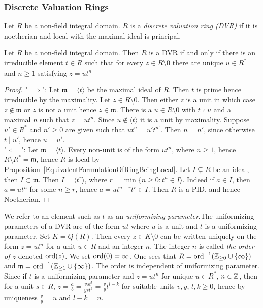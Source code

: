 \subsubsection{Discrete Valuation Rings}
    \begin{definition}
        Let $R$ be a non-field integral domain. $R$ is a \textit{discrete valuation ring (DVR)} if it is noetherian and local with the maximal ideal is principal. 
    \end{definition}
    \begin{proposition}\label{EquivalentDefinitionOfDVR}
        Let $R$ be a non-field integral domain. Then $R$ is a DVR if and only if there is an irreducible element $t\in R$ such that for every $z\in R\setminus 0$ there are unique $u\in R^\ast$ and $n\geq 1$ satisfying $z=ut^n$
    \end{proposition}
    \begin{proof}
        "$\implies $": Let $\mathfrak{m}=\langle t\rangle$ be the maximal ideal of $R$. Then $t$ is prime hence irreducible by the maximality. Let $z\in R\setminus0$. Then either $z$ is a unit in which case $z\notin \mathfrak{m}$ or $z$ is not a unit hence $z\in\mathfrak{m}$. There is a $u\in R\setminus 0$ with $t\nmid u$ and a maximal $n$ such that $z=ut^n$. Since $u\notin \langle t\rangle$ it is a unit by maximality. Suppose $u'\in R^\ast $ and $n'\geq0$ are given such that $ut^n = u't^{n'}$. Then $n=n'$, since otherwise $t\mid u'$, hence $u=u'$.\\
        "$\impliedby$": Let $\mathfrak{m}=\langle t\rangle$. Every non-unit is of the form $ut^n$, where $n\geq 1$, hence $R\setminus R^\ast = \mathfrak{m}$, hence $R$ is local by Proposition~\ref{EquivalentFormulationOfRingBeingLocal}. Let $I\subsetneq R$ be an ideal, then $I\subset \mathfrak{m}$. Then $I=\langle t^r\rangle$, where $r=\min \{n\geq 0: t^n\in I\rangle.$ Indeed if $a\in I$, then $a=ut^n$ for some $n\geq r$, hence $a=ut^{n-r}t^{r}\in I$. Then $R$ is a PID, and hence Noetherian.   
    \end{proof}
    \begin{remark}
        We refer to an element such as $t$ as an \textit{uniformizing parameter}.The uniformizing parameters of a DVR are of the form $ut$ where $u$ is a unit and $t$ is a uniformizing parameter. Set $K=Q(R)$. Then every $z\in K\setminus0$ can be written uniquely on the form $z=ut^{n}$ for a unit $u\in R$ and an integer $n$. The integer $n$ is called \textit{the order of $z$} denoted $\mathrm{ord}(z)$. We set $\mathrm{ord}(0)=\infty$. One sees that $R=\mathrm{ord}^{-1}(\mathbb{Z}_{\geq 0}\cup\{\infty\})$ and $\mathfrak{m}=\mathrm{ord}^{-1}(\mathbb{Z}_{\geq 1}\cup\{\infty\})$. The order is independent of uniformizing parameter. Since if $t$ is a uniformizing parameter and $z = ut^n$ for unique $u\in R^\ast$, $n\in \mathbb{Z}$, then for a unit $s\in R$, $z= \frac{a}{b} = \frac{vst^l}{yst^k} = \frac{v}{y}t^{l-k}$ for suitable units $v,y$, $l,k\geq 0$, hence by uniqueness $\frac{v}{y}=u$ and $l-k=n$.   
    \end{remark}
